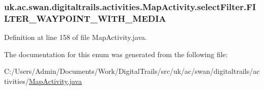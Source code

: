 \hypertarget{enumuk_1_1ac_1_1swan_1_1digitaltrails_1_1activities_1_1_map_activity_1_1select_filter_ad7d212415b9ac504eefd2278a392c9eb}{
\subsubsection[{F\+I\+L\+T\+E\+R\+\_\+\+W\+A\+Y\+P\+O\+I\+N\+T\+\_\+\+W\+I\+T\+H\+\_\+\+M\+E\+D\+I\+A}]{\setlength{\rightskip}{0pt plus 5cm}uk.\+ac.\+swan.\+digitaltrails.\+activities.\+Map\+Activity.\+select\+Filter.\+F\+I\+L\+T\+E\+R\+\_\+\+W\+A\+Y\+P\+O\+I\+N\+T\+\_\+\+W\+I\+T\+H\+\_\+\+M\+E\+D\+I\+A}}\label{enumuk_1_1ac_1_1swan_1_1digitaltrails_1_1activities_1_1_map_activity_1_1select_filter_ad7d212415b9ac504eefd2278a392c9eb}


Definition at line 158 of file Map\+Activity.\+java.



The documentation for this enum was generated from the following file\+:\begin{DoxyCompactItemize}
\item 
C\+:/\+Users/\+Admin/\+Documents/\+Work/\+Digital\+Trails/src/uk/ac/swan/digitaltrails/activities/\hyperlink{_map_activity_8java}{Map\+Activity.\+java}\end{DoxyCompactItemize}
